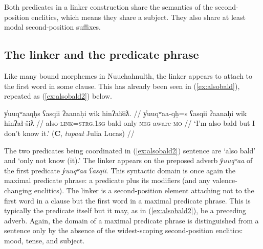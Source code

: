 Both predicates in a linker construction share the semantics of the second-position enclitics, which means they share a subject. They also share at least modal second-position suffixes.


\begin{comment}
\ex \label{ex:someonespoke}
\begingl
\glpreamble ʔuušqḥʔaƛ ciqšiƛ.//
\gla ʔuuš-qḥ=ʔaƛ ciq-šiƛ //
\glb some-\textsc{link}=\textsc{now} speak-\textsc{mo} //
\glft `Someone spoke.' //
\endgl
\xe

\ex~ \label{ex:*someonespoke}
\begingl
\glpreamble *ʔuušqḥʔaƛ ciqšiƛḥ.//
\gla *ʔuuš-(q)ḥ=ʔaƛ ciq-šiƛ-(q)ḥ //
\glb *some-\textsc{link}=\textsc{now} speak-\textsc{mo}-\textsc{link} //
\glft Intended: `Someone spoke.' //
\endgl
\xe
\end{comment}


\subsection{The linker and the predicate phrase} \label{ch:link:2p}

Like many bound morphemes in Nuuchahnulth, the linker appears to attach to the first word in some clause. This has already been seen in (\ref{ex:alsobald}), repeated as (\ref{ex:alsobald2}) below.

\ex \label{ex:alsobald2}
\begingl
\glpreamble y̓uuqʷaaqḥs ʕasqii ʔaanaḥi wik hinʔałšiƛ. //
\gla y̓uuqʷaa-qḥ=s ʕasqii ʔaanaḥi wik hinʔał-šiƛ //
\glb also-\textsc{link}=\textsc{strg.1sg} bald only \textsc{neg} aware-\textsc{mo} //
\glft `I'm also bald but I don't know it.' (\textbf{C}, \textit{tupaat} Julia Lucas) //
\endgl
\xe

The two predicates being coordinated in (\ref{ex:alsobald2}) sentence are `also bald' and `only not know (it).' The linker appears on the preposed adverb \textit{y̓uuqʷaa} of the first predicate \textit{y̓uuqʷaa ʕasqii}.	This syntactic domain is once again the maximal predicate phrase: a predicate plus its modifiers (and any valence-changing enclitics). The linker is a second-position element attaching not to the first word in a clause but the first word in a maximal predicate phrase. This is typically the predicate itself but it may, as in (\ref{ex:alsobald2}), be a preceding adverb. Again, the domain of a maximal predicate phrase is distinguished from a sentence only by the absence of the widest-scoping second-position enclitics: mood, tense, and subject.

